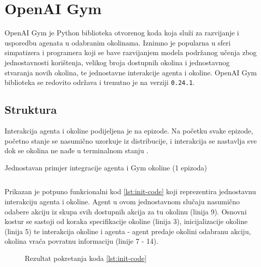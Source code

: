 \chapter{OpenAI Gym}

OpenAI Gym je Python biblioteka  otvorenog koda  koja služi za razvijanje i usporedbu agenata u odabranim okolinama. Iznimno je popularna u sferi simpatizera i programera koji se bave razvijanjem modela podržanog učenja zbog jednostavnosti korištenja, velikog broja dostupnih okolina i jednostavnog stvaranja novih okolina, te jednostavne interakcije agenta i okoline. OpenAI Gym biblioteka se redovito održava i trenutno je na verziji \texttt{0.24.1}. 

\section{Struktura}

Interakcija agenta i okoline podijeljena je na epizode. Na početku svake epizode, početno stanje se nasumično uzorkuje iz distribucije, i interakcija se nastavlja sve dok se okolina ne nađe u terminalnom stanju \cite{OpenAIWhitepaper}.

\begin{listing}[H]
    \caption{Jednostavan primjer integracije agenta i Gym okoline (1 epizoda)}
    \inputminted{python}{snippets/init.py}
    \label{lst:init-code}
\end{listing}

Prikazan je potpuno funkcionalni kod \ref{lst:init-code} koji reprezentira jednostavnu interakciju agenta i okoline. Agent u ovom jednostavnom slučaju nasumično odabere akciju iz skupa svih dostupnih akcija za tu okolinu (linija 9). Osnovni kostur se sastoji od koraka specifikacije okoline (linija 3), inicijalizacije okoline (linija 5) te interakcija okoline i agenta - agent predaje okolini odabranu akciju, okolina vraća povratnu informaciju (linije 7 - 14). 

\begin{figure}[h]
    \centering
    \caption{Rezultat pokretanja koda \ref{lst:init-code}}
    \label{fig:mountain-car}
\end{figure}

